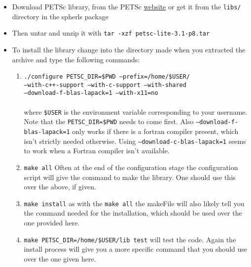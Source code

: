 \documentclass[12pt,a4paper]{book}
\begin{document}
\begin{itemize}
\item Download PETSc library, from the PETSc \href{http://www.mcs.anl.gov/petsc/download/index.html}{website} or get it from the {\tt libs/} directory in the spherls package
\item Then untar and unzip it with {\tt tar -xzf petsc-lite-3.1-p8.tar}
\item To install the library change into the directory made when you extracted the archive and type the following commands:
\begin{enumerate}
\item {\tt ./configure PETSC\_DIR=\$PWD --prefix=/home/\$USER/ }\\{\tt --with-c++-support --with-c-support --with-shared}\\{\tt --download-f-blas-lapack=1 --with-x11=no}\\ \\ where {\tt \$USER} is the environment variable corresponding to your username.  Note that the {\tt PETSC\_DIR=\$PWD} needs to come first. Also {\tt --download-f-blas-lapack=1} only works if there is a fortran compiler present, which isn't strictly needed otherwise. Using {\tt --download-c-blas-lapack=1} seems to work when a Fortran compiler isn't available.
\item {\tt make all} Often at the end of the configuration stage the configuration script will give the command to make the library. One should use this over the above, if given.
\item {\tt make install} as with the {\tt make all} the makeFile will also likely tell you the command needed for the installation, which should be used over the one provided here.
\item {\tt make PETSC\_DIR=/home/\$USER/lib test} will test the code. Again the install process will give you a more specific command that you should use over the one given here.
\end{enumerate}
\end{itemize}
\end{document}
